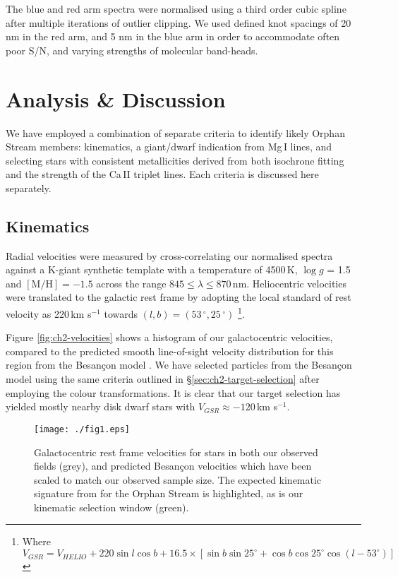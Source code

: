 The blue and red arm spectra were normalised using a third order cubic spline after multiple iterations of outlier clipping. We used defined knot spacings of 20 nm in the red arm, and 5 nm in the blue arm in order to accommodate often poor S/N, and varying strengths of molecular band-heads.

\section{Analysis \& Discussion}
\label{sec:ch2-analysis}

We have employed a combination of separate criteria to identify likely Orphan Stream members: kinematics, a giant/dwarf indication from Mg\,\textsc{I} lines, and selecting stars with consistent metallicities derived from both isochrone fitting and the strength of the Ca\,\textsc{II} triplet lines. Each criteria is discussed here separately.

\subsection{Kinematics}
Radial velocities were measured by cross-correlating our normalised spectra against a K-giant synthetic template with a temperature of 4500\,K, $\log{g}$ = 1.5 and $[\mbox{M/H}] = -1.5$ across the range $845 \leq \lambda \leq 870$\,nm. Heliocentric velocities were translated to the galactic rest frame by adopting the local standard of rest velocity as 220\,km s$^{-1}$ towards $(l, b) = (53\,^\circ, 25\,^\circ)$ \citep{Kerr_Lynden-Bell_1986, Mihalas_Binney_1981}\footnote{Where $V_{GSR} = V_{HELIO} + 220\sin{l}\cos{b} + 16.5\times[\sin{b}\sin{25^\circ} + \cos{b}\cos{25^\circ}\cos{(l - 53^\circ)}]$}.

Figure \ref{fig:ch2-velocities} shows a histogram of our galactocentric velocities, compared to the predicted smooth line-of-sight velocity distribution for this region from the Besan\c{c}on model \citep{Robin_et-al_2003}. We have selected particles from the Besan\c{c}on model using the same criteria outlined in \S\ref{sec:ch2-target-selection} after employing the \citet{Jordi_et-al_2006} colour transformations. It is clear that our target selection has yielded mostly nearby disk dwarf stars with $V_{GSR} \approx -120$\,km s$^{-1}$.

\begin{figure}[h]
	\texttt{[image: ./fig1.eps]}
	\caption{Galactocentric rest frame velocities for stars in both our observed fields (grey), and predicted Besan\c{c}on velocities which have been scaled to match our observed sample size. The expected kinematic signature from \citet{Newberg_et-al_2010} for the Orphan Stream is highlighted, as is our kinematic selection window (green).}
	\label{fig:velocities}
\end{figure}
 


